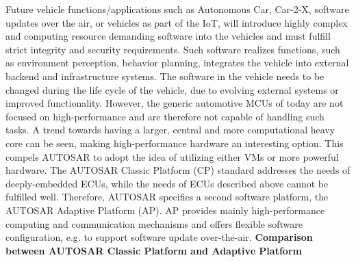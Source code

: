 Future vehicle functions/applications such as Autonomous Car, Car-\/2-\/X, software updates over the air, or vehicles as part of the IoT, will introduce highly complex and computing resource demanding software into the vehicles and must fulfill strict integrity and security requirements. Such software realizes functions, such as environment perception, behavior planning, integrates the vehicle into external backend and infrastructure systems. The software in the vehicle needs to be changed during the life cycle of the vehicle, due to evolving external systems or improved functionality. However, the generic automotive M\+C\+Us of today are not focused on high-\/performance and are therefore not capable of handling such tasks. A trend towards having a larger, central and more computational heavy core can be seen, making high-\/performance hardware an interesting option. This compels A\+U\+T\+O\+S\+AR to adopt the idea of utilizing either V\+Ms or more powerful hardware. The A\+U\+T\+O\+S\+AR Classic Platform (CP) standard addresses the needs of deeply-\/embedded E\+C\+Us, while the needs of E\+C\+Us described above cannot be fulfilled well. Therefore, A\+U\+T\+O\+S\+AR specifies a second software platform, the A\+U\+T\+O\+S\+AR Adaptive Platform (AP). AP provides mainly high-\/performance computing and communication mechanisms and offers flexible software configuration, e.\+g. to support software update over-\/the-\/air.  {\bfseries Comparison between A\+U\+T\+O\+S\+AR Classic Platform and Adaptive Platform}

